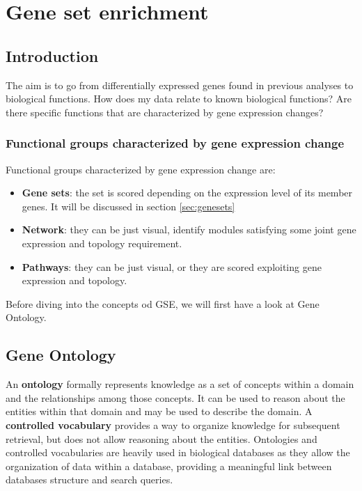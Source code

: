 \graphicspath{{chapters/06/images/}}
\chapter{Gene set enrichment}
	\section{Introduction}
	The aim is to go from differentially expressed genes found in previous analyses to biological functions. How does my data relate to known biological functions? Are there specific functions that are characterized by gene expression changes?

	\subsection{Functional groups characterized by gene expression change}
	Functional groups characterized by gene expression change are:

	
		\begin{itemize}
			\item \textbf{Gene sets}: the set is scored depending on the expression level of its member genes. It will be discussed in section \ref{sec:genesets}
			\item \textbf{Network}: they can be just visual, identify modules satisfying some joint gene expression and topology requirement.
			\item \textbf{Pathways}: they can be just visual, or they are scored exploiting gene expression and topology.
		\end{itemize}

Before diving into the concepts od GSE, we will first have a look at Gene Ontology.
	



	\section{Gene Ontology}
	An \textbf{ontology} formally represents knowledge as a set of concepts within a domain and the relationships among those concepts.
	It can be used to reason about the entities within that domain and may be used to describe the domain.
	A \textbf{controlled vocabulary} provides a way to organize knowledge for subsequent retrieval, but does not allow reasoning about the entities.
Ontologies and controlled vocabularies are heavily used in biological databases as they allow the organization of data within a database, providing a meaningful link between databases structure and search queries.

